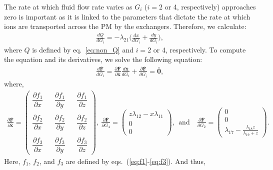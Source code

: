 The rate at which fluid flow rate varies as $G_i$ ($i = 2$ or 4, respectively) approaches zero is important as it is linked to the parameters that dictate the rate at which ions are transported across the PM by the exchangers. Therefore, we calculate:
\begin{align}
\frac{dQ}{dG_i}=-\lambda_{21} \Bigg( \frac{dx}{dG_i} + \frac{dy}{dG_i} \Bigg),
\label{eq:dQ}
\end{align}
where $Q$ is defined by eq.~\eqref{eq:non_Q} and  $i = 2$ or 4, respectively. To compute the equation and its derivatives, we solve the following equation:
\begin{align}
\frac{d\bar{\textbf{F}}}{dG_i}=\frac{\partial \bar{\textbf{F}}}{\partial \bar{\textbf{x}}} \frac{d\bar{\textbf{x}}}{dG_i}+\frac{\partial \bar{\textbf{F}}}{\partial G_i} = \bar{\textbf{0}},
\end{align}
where, 
\begin{align*}
\frac{\partial \bar{\textbf{F}}}{\partial \bar{\textbf{x}}} = \begin{pmatrix}
\dfrac{\partial f_1}{\partial x} && \dfrac{\partial f_1}{\partial y} && \dfrac{\partial f_1}{\partial z} \\
\\
\dfrac{\partial f_2}{\partial x} && \dfrac{\partial f_2}{\partial y} && \dfrac{\partial f_2}{\partial z} \\
\\
\dfrac{\partial f_3}{\partial x} && \dfrac{\partial f_3}{\partial y} && \dfrac{\partial f_3}{\partial z}
\end{pmatrix}, \
\frac{\partial  \bar{\textbf{F}} }{\partial G_4}= 
\begin{pmatrix}
z \lambda_{12}-x \lambda_{11} \\
0\\
0
\end{pmatrix}, \ \ \text{and} \quad 
\frac{\partial  \bar{\textbf{F}} }{\partial G_2}= 
\begin{pmatrix}
0\\
0\\
\lambda_{17} - \frac{\lambda_{18}z}{\lambda_{19} + z}
\end{pmatrix}.
\end{align*}
Here, $f_1$, $f_2$, and $f_3$ are defined by eqs.~(\ref{eq:f1}-\ref{eq:f3}). And thus,
